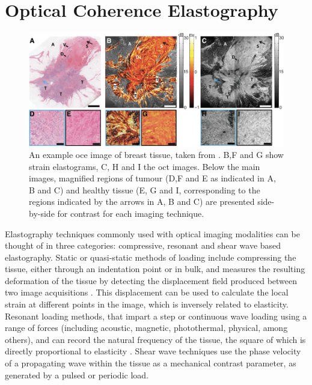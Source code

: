 \section{Optical Coherence Elastography}\label{solution}
\begin{figure}
	\centering
    \includegraphics[width=\textwidth]{bground_figs/oce_example.png}
	\caption{An example \ac{oce} image of breast tissue, taken from \cite{kennedy_investigation_2015}. B,F and G show strain elastograms, C, H and I the \ac{oct} images. Below the main images, magnified regions of tumour (D,F and E as indicated in A, B and C) and healthy tissue (E, G and I, corresponding to the regions indicated by the arrows in A, B and C) are presented side-by-side for contrast for each imaging technique.}
    \label{oce_example}	
\end{figure}

Elastography techniques commonly used with optical imaging modalities can be thought of in three categories: compressive, resonant and shear wave based elastography. Static or quasi-static methods of loading include compressing the tissue, either through an indentation point or in bulk, and measures the resulting deformation of the tissue by detecting the displacement field produced between two image acquisitions \cite{kennedy_optical_2014}. This displacement can be used to calculate the local strain at different points in the image, which is inversely related to elasticity. Resonant loading methods, that impart a step or continuous wave loading using a range of forces (including acoustic, magnetic, photothermal, physical, among others), and can record the natural frequency of the tissue, the square of which is directly proportional to elasticity \cite{kennedy_optical_2015}. Shear wave techniques use the phase velocity of a propagating wave within the tissue as a mechanical contrast parameter, as generated by a pulsed or periodic load. 

